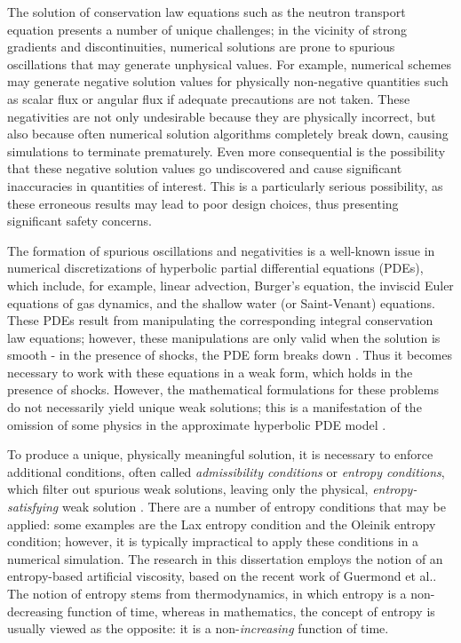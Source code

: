 The solution of conservation law equations such as the neutron transport
equation presents a number of unique challenges; in the vicinity of strong
gradients and discontinuities, numerical solutions are prone to spurious
oscillations that may generate unphysical values. For example,
numerical schemes may generate negative solution values for physically
non-negative quantities such as scalar flux or angular flux
if adequate precautions are not taken.
These negativities are not only undesirable because they are physically
incorrect, but also because often numerical solution algorithms completely break
down, causing simulations to terminate prematurely. Even more consequential
is the possibility that these negative solution values go undiscovered
and cause significant inaccuracies in quantities of interest.
This is a particularly serious possibility, as these erroneous results may
lead to poor design choices, thus presenting significant safety concerns.

The formation of spurious oscillations and negativities is a well-known issue
in numerical discretizations of hyperbolic partial differential equations (PDEs), which
include, for example, linear advection, Burger's equation, the inviscid Euler
equations of gas dynamics, and the shallow water (or Saint-Venant) equations.
These PDEs result from manipulating the corresponding integral conservation law
equations; however, these manipulations are only valid when the solution is
smooth - in the presence of shocks, the PDE form breaks down
\cite{leveque2002}. Thus it becomes necessary to work with these
equations in a weak form, which holds in the presence of shocks.  However, the
mathematical formulations for these problems do not necessarily yield unique
weak solutions; this is a manifestation of the omission of some physics in the
approximate hyperbolic PDE model \cite{leveque2002}.

To produce a unique, physically meaningful solution, it is necessary to
enforce additional conditions, often called \emph{admissibility conditions}
or \emph{entropy conditions}, which filter out spurious weak solutions,
leaving only the physical, \emph{entropy-satisfying} weak solution
\cite{leveque2002}.
There are a number of entropy conditions that may be applied: some
examples are the Lax entropy condition and the Oleinik entropy
condition\cite{leveque2002}; however, it is typically impractical
to apply these conditions in a numerical simulation. The research in this
dissertation employs the notion of an entropy-based artificial viscosity,
based on the recent work of Guermond et al.\cite{guermond_ev}.
The notion of entropy stems from
thermodynamics, in which entropy is a non-decreasing function of time, whereas
in mathematics, the concept of entropy is usually viewed as the opposite: it is
a non-\emph{increasing} function of time.

